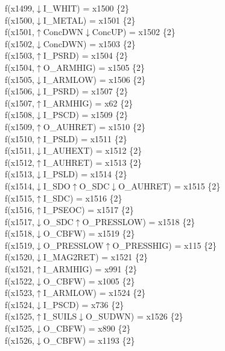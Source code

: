 f(x1499,$\downarrow$I\_WHIT) = x1500 \{2\} \\  
f(x1500,$\downarrow$I\_METAL) = x1501 \{2\} \\  
f(x1501,$\uparrow$ConcDWN$\downarrow$ConcUP) = x1502 \{2\} \\  
f(x1502,$\downarrow$ConcDWN) = x1503 \{2\} \\  
f(x1503,$\uparrow$I\_PSRD) = x1504 \{2\} \\  
f(x1504,$\uparrow$O\_ARMHIG) = x1505 \{2\} \\  
f(x1505,$\downarrow$I\_ARMLOW) = x1506 \{2\} \\  
f(x1506,$\downarrow$I\_PSRD) = x1507 \{2\} \\  
f(x1507,$\uparrow$I\_ARMHIG) = x62 \{2\} \\  
f(x1508,$\downarrow$I\_PSCD) = x1509 \{2\} \\  
f(x1509,$\uparrow$O\_AUHRET) = x1510 \{2\} \\  
f(x1510,$\uparrow$I\_PSLD) = x1511 \{2\} \\  
f(x1511,$\downarrow$I\_AUHEXT) = x1512 \{2\} \\  
f(x1512,$\uparrow$I\_AUHRET) = x1513 \{2\} \\  
f(x1513,$\downarrow$I\_PSLD) = x1514 \{2\} \\  
f(x1514,$\downarrow$I\_SDO$\uparrow$O\_SDC$\downarrow$O\_AUHRET) = x1515 \{2\} \\  
f(x1515,$\uparrow$I\_SDC) = x1516 \{2\} \\  
f(x1516,$\uparrow$I\_PSEOC) = x1517 \{2\} \\  
f(x1517,$\downarrow$O\_SDC$\uparrow$O\_PRESSLOW) = x1518 \{2\} \\  
f(x1518,$\downarrow$O\_CBFW) = x1519 \{2\} \\  
f(x1519,$\downarrow$O\_PRESSLOW$\uparrow$O\_PRESSHIG) = x115 \{2\} \\  
f(x1520,$\downarrow$I\_MAG2RET) = x1521 \{2\} \\  
f(x1521,$\uparrow$I\_ARMHIG) = x991 \{2\} \\  
f(x1522,$\downarrow$O\_CBFW) = x1005 \{2\} \\  
f(x1523,$\uparrow$I\_ARMLOW) = x1524 \{2\} \\  
f(x1524,$\downarrow$I\_PSCD) = x736 \{2\} \\  
f(x1525,$\uparrow$I\_SUILS$\downarrow$O\_SUDWN) = x1526 \{2\} \\  
f(x1525,$\downarrow$O\_CBFW) = x890 \{2\} \\  
f(x1526,$\downarrow$O\_CBFW) = x1193 \{2\} \\  
